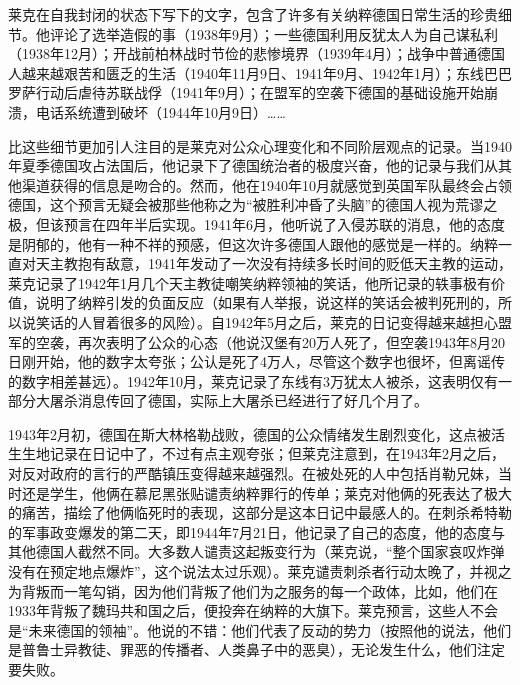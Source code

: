 \documentclass[UTF8]{ctexart}
\begin{document}
莱克在自我封闭的状态下写下的文字，包含了许多有关纳粹德国日常生活的珍贵细节。他评论了选举造假的事（1938年9月）；一些德国利用反犹太人为自己谋私利（1938年12月）；开战前柏林战时节俭的悲惨境界（1939年4月）；战争中普通德国人越来越艰苦和匮乏的生活（1940年11月9日、1941年9月、1942年1月）；东线巴巴罗萨行动后虐待苏联战俘（1941年9月）；在盟军的空袭下德国的基础设施开始崩溃，电话系统遭到破坏（1944年10月9日）……

比这些细节更加引人注目的是莱克对公众心理变化和不同阶层观点的记录。当1940年夏季德国攻占法国后，他记录下了德国统治者的极度兴奋，他的记录与我们从其他渠道获得的信息是吻合的。然而，他在1940年10月就感觉到英国军队最终会占领德国，这个预言无疑会被那些他称之为“被胜利冲昏了头脑”的德国人视为荒谬之极，但该预言在四年半后实现。1941年6月，他听说了入侵苏联的消息，他的态度是阴郁的，他有一种不祥的预感，但这次许多德国人跟他的感觉是一样的。纳粹一直对天主教抱有敌意，1941年发动了一次没有持续多长时间的贬低天主教的运动，莱克记录了1942年1月几个天主教徒嘲笑纳粹领袖的笑话，他所记录的轶事极有价值，说明了纳粹引发的负面反应（如果有人举报，说这样的笑话会被判死刑的，所以说笑话的人冒着很多的风险）。自1942年5月之后，莱克的日记变得越来越担心盟军的空袭，再次表明了公众的心态（他说汉堡有20万人死了，但空袭1943年8月20日刚开始，他的数字太夸张；公认是死了4万人，尽管这个数字也很坏，但离谣传的数字相差甚远）。1942年10月，莱克记录了东线有3万犹太人被杀，这表明仅有一部分大屠杀消息传回了德国，实际上大屠杀已经进行了好几个月了。

1943年2月初，德国在斯大林格勒战败，德国的公众情绪发生剧烈变化，这点被活生生地记录在日记中了，不过有点主观夸张；但莱克注意到，在1943年2月之后，对反对政府的言行的严酷镇压变得越来越强烈。在被处死的人中包括肖勒兄妹，当时还是学生，他俩在慕尼黑张贴谴责纳粹罪行的传单；莱克对他俩的死表达了极大的痛苦，描绘了他俩临死时的表现，这部分是这本日记中最感人的。在刺杀希特勒的军事政变爆发的第二天，即1944年7月21日，他记录了自己的态度，他的态度与其他德国人截然不同。大多数人谴责这起叛变行为（莱克说，“整个国家哀叹炸弹没有在预定地点爆炸”，这个说法太过乐观）。莱克谴责刺杀者行动太晚了，并视之为背叛而一笔勾销，因为他们背叛了他们为之服务的每一个政体，比如，他们在1933年背叛了魏玛共和国之后，便投奔在纳粹的大旗下。莱克预言，这些人不会是“未来德国的领袖”。他说的不错：他们代表了反动的势力（按照他的说法，他们是普鲁士异教徒、罪恶的传播者、人类鼻子中的恶臭），无论发生什么，他们注定要失败。
\end{document}
